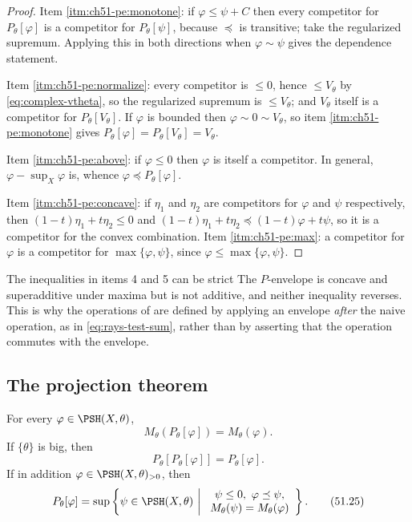\begin{proof}
Item \cref{itm:ch51-pe:monotone}: if \(\varphi\leq\psi+C\) then every
competitor for \(P_\theta[\varphi]\) is a competitor for
\(P_\theta[\psi]\), because \(\preceq\) is transitive; take the
regularized supremum.  Applying this in both directions when
\(\varphi\sim\psi\) gives the dependence statement.

Item \cref{itm:ch51-pe:normalize}: every competitor is \(\leq0\), hence
\(\leq V_\theta\) by \eqref{eq:complex-vtheta}, so the regularized
supremum is \(\leq V_\theta\); and \(V_\theta\) itself is a competitor for
\(P_\theta[V_\theta]\).  If \(\varphi\) is bounded then
\(\varphi\sim0\sim V_\theta\), so item \cref{itm:ch51-pe:monotone} gives
\(P_\theta[\varphi]=P_\theta[V_\theta]=V_\theta\).

Item \cref{itm:ch51-pe:above}: if \(\varphi\leq0\) then \(\varphi\) is
itself a competitor.  In general, \(\varphi-\sup_X\varphi\) is, whence
\(\varphi\preceq P_\theta[\varphi]\).

Item \cref{itm:ch51-pe:concave}: if \(\eta_1\) and \(\eta_2\) are
competitors for \(\varphi\) and \(\psi\) respectively, then
\((1-t)\eta_1+t\eta_2\leq0\) and
\((1-t)\eta_1+t\eta_2\preceq(1-t)\varphi+t\psi\), so it is a competitor
for the convex combination.  Item \cref{itm:ch51-pe:max}: a competitor for
\(\varphi\) is a competitor for \(\max\{\varphi,\psi\}\), since
\(\varphi\leq\max\{\varphi,\psi\}\).
\end{proof}

\begin{warning}{The inequalities in items 4 and 5 can be strict}
\label{warn:ch51-p-not-linear}
The \(P\)-envelope is concave and superadditive under maxima but is not
additive, and neither inequality reverses.  This is why the operations
of  are defined by applying an envelope
\emph{after} the naive operation, as in
\eqref{eq:rays-test-sum}, rather than by asserting that the operation
commutes with the envelope.
\end{warning}

\subsection{The projection theorem}
\label{sec:ch51-p-projection}

\begin{theorem}\label{thm:complex-p-projection}
For every \(\varphi\in\PSH(X,\theta)\),
\[
 M_\theta(P_\theta[\varphi])=M_\theta(\varphi).
\tag{51.23}\label{eq:complex-p-projection}
\]
If \(\{\theta\}\) is big, then
\[
 P_\theta[P_\theta[\varphi]]=P_\theta[\varphi].
\tag{51.24}\label{eq:complex-p-idempotence}
\]
If in addition \(\varphi\in\PSH(X,\theta)_{>0}\), then
\[
 P_\theta[\varphi]
 =\sup\left\{\psi\in\PSH(X,\theta)\ \middle|\
 \begin{array}{c}
 \psi\leq0,\ \varphi\preceq\psi,\\
 M_\theta(\psi)=M_\theta(\varphi)
 \end{array}\right\}.
\tag{51.25}\label{eq:complex-p-characterization}
\]
\end{theorem}


